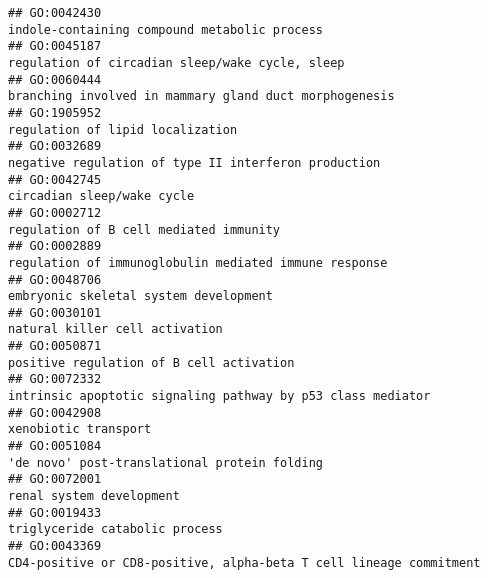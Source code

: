 \documentclass[
]{article}
\begin{document}
\begin{verbatim}
## GO:0042430                                                                                                     indole-containing compound metabolic process
## GO:0045187                                                                                                  regulation of circadian sleep/wake cycle, sleep
## GO:0060444                                                                                           branching involved in mammary gland duct morphogenesis
## GO:1905952                                                                                                                 regulation of lipid localization
## GO:0032689                                                                                             negative regulation of type II interferon production
## GO:0042745                                                                                                                       circadian sleep/wake cycle
## GO:0002712                                                                                                           regulation of B cell mediated immunity
## GO:0002889                                                                                            regulation of immunoglobulin mediated immune response
## GO:0048706                                                                                                            embryonic skeletal system development
## GO:0030101                                                                                                                   natural killer cell activation
## GO:0050871                                                                                                         positive regulation of B cell activation
## GO:0072332                                                                                      intrinsic apoptotic signaling pathway by p53 class mediator
## GO:0042908                                                                                                                             xenobiotic transport
## GO:0051084                                                                                                     'de novo' post-translational protein folding
## GO:0072001                                                                                                                         renal system development
## GO:0019433                                                                                                                   triglyceride catabolic process
## GO:0043369                                                                               CD4-positive or CD8-positive, alpha-beta T cell lineage commitment

\end{verbatim}
\end{document}
